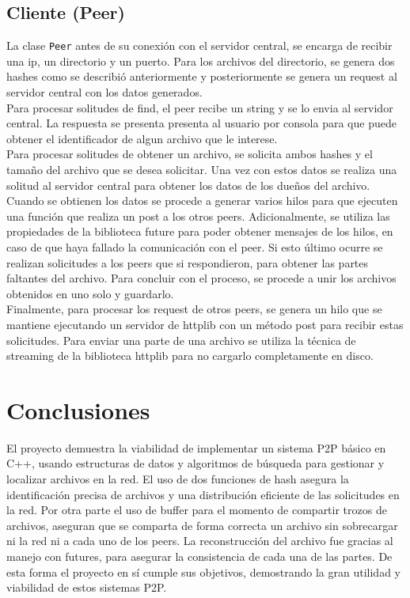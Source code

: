 \documentclass{article}
\begin{document}
\subsection{Cliente (Peer)}
La clase \texttt{Peer} antes de su conexi\'on con el servidor central, se encarga de recibir una ip, un directorio y un puerto. Para los archivos del directorio, se genera dos hashes como se describi\'o anteriormente y posteriormente se genera un request al servidor central con los datos generados.\\
Para procesar solitudes de find, el peer recibe un string y se lo envia al servidor central. La respuesta se presenta presenta al usuario por consola para que puede obtener el identificador de algun archivo que le interese. \\

Para procesar solitudes de obtener un archivo, se solicita ambos hashes y el tamaño del archivo que se desea solicitar. 
Una vez con estos datos se realiza una solitud al servidor central para obtener los datos de los dueños del archivo. 
Cuando se obtienen los datos se procede a generar varios hilos para que ejecuten una función que realiza un post a los otros peers. Adicionalmente, se utiliza las propiedades de la biblioteca future para poder obtener mensajes de los hilos, 
en caso de que haya fallado la comunicación con el peer. Si esto último ocurre se realizan solicitudes a los peers que si respondieron, para obtener las partes faltantes del archivo. 
Para concluir con el proceso, se procede a unir los archivos obtenidos en uno solo y guardarlo.\\

Finalmente, para procesar los request de otros peers, se genera un hilo que se mantiene ejecutando un servidor de httplib con un método 
post para recibir estas solicitudes. Para enviar una parte de una archivo se utiliza la técnica de streaming de la biblioteca httplib para no cargarlo completamente en disco.

\section{Conclusiones}
El proyecto demuestra la viabilidad de implementar un sistema P2P básico en C++, usando estructuras de datos y algoritmos de búsqueda para gestionar y localizar archivos en la red. El uso de dos funciones de hash asegura la identificación precisa de archivos y una distribución eficiente de las solicitudes en la red. Por otra parte el uso de buffer para el momento de compartir trozos de archivos, aseguran que se comparta de forma correcta un archivo sin sobrecargar ni la red ni a cada uno de los peers. La reconstrucci\'on del archivo fue gracias al manejo con futures, para asegurar la consistencia de cada una de las partes. De esta forma el proyecto en s\'i cumple sus objetivos, demostrando la gran utilidad y viabilidad de estos sistemas P2P.
\end{document}

